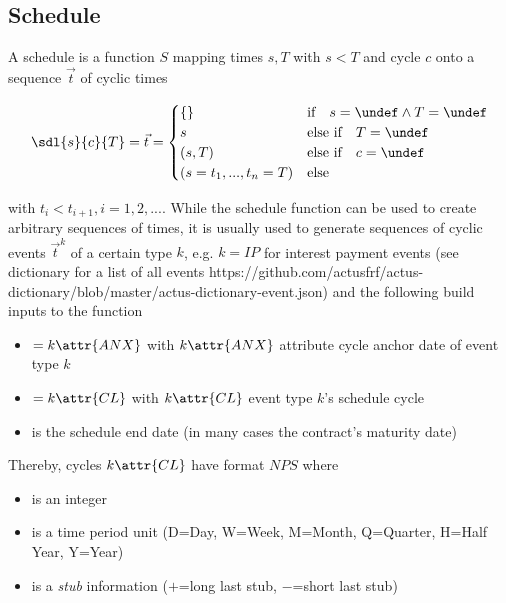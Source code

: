 

\subsection{Schedule}\label{sec:schedule}

A schedule is a function $S$ mapping times $s,T$ with $s<T$ and cycle $c$ onto a sequence $\vec{t}$ of cyclic times

\[
	\sdl{s}{c}{T}=\vec{t}=\begin{cases} \{\} & \text{if}\quad s=\undef\land T=\undef\\
					s & \text{else if}\quad T=\undef\\
					(s,T) & \text{else if}\quad c=\undef\\
					(s=t_1,...,t_n=T) & \text{else} \end{cases}
\]

with $t_i<t_{i+1}, i=1,2,...$. While the schedule function can be used to create arbitrary sequences of times, it is usually used to generate sequences of cyclic events $\vec{t}^k$ of a certain type $k$, e.g. $k=IP$ for interest payment events (see dictionary for a list of all events https://github.com/actusfrf/actus-dictionary/blob/master/actus-dictionary-event.json) and the following build inputs to the function

\begin{itemize}
	\item[$s$] $=k\attr{ANX}$ with $k\attr{ANX}$ attribute cycle anchor date of event type $k$

	\item[$c$] $=k\attr{CL}$ with $k\attr{CL}$ event type $k$'s schedule cycle

	\item[$T$] is the schedule end date (in many cases the contract's maturity date)
\end{itemize}

Thereby, cycles $k\attr{CL}$ have format $NPS$ where

\begin{itemize}
	\item[$N$] is an integer
	\item[$P$] is a time period unit (D=Day, W=Week, M=Month, Q=Quarter, H=Half Year, Y=Year)
	\item[$S$] is a \textit{stub} information ($+$=long last stub, $-$=short last stub)
\end{itemize}

